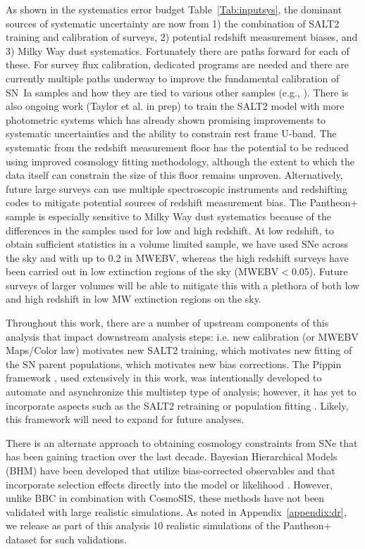 \documentclass[twocolumn]{aastex63}
\begin{document}
{ As shown in the systematics error budget Table~\ref{Tab:inputsys}, the dominant sources of systematic uncertainty are now from 1) the combination of SALT2 training and calibration of surveys, 2) potential redshift measurement biases, and 3) Milky Way dust systematics. Fortunately there are paths forward for each of these. For survey flux calibration, dedicated programs are needed and there are currently multiple paths underway to improve the fundamental calibration of SN~Ia samples and how they are tied to various other samples (e.g., \citealp{Regnault2015,Narayan19,stubbs2015precise}). There is also ongoing work (Taylor et al. in prep) to train the SALT2 model with more photometric systems which has already shown promising improvements to systematic uncertainties and the ability to constrain rest frame U-band. The systematic from the redshift measurement floor has the potential to be reduced using improved cosmology fitting methodology, although the extent to which the data itself can constrain the size of this floor remains unproven. Alternatively, future large surveys can use multiple spectroscopic instruments and redshifting codes to mitigate potential sources of redshift measurement bias. The Pantheon+ sample is especially sensitive to Milky Way dust systematics because of the differences in the samples used for low and high redshift. At low redshift, to obtain sufficient statistics in a volume limited sample, we have used SNe across the sky and with up to 0.2 in MWEBV, whereas the high redshift surveys have been carried out in low extinction regions of the sky (MWEBV$<$0.05). Future surveys of larger volumes will be able to mitigate this with a plethora of both low and high redshift in low MW extinction regions on the sky.}  

Throughout this work, there are a number of upstream components of this analysis that impact downstream analysis steps: i.e. new calibration (or MWEBV Maps/Color law) motivates new SALT2 training, which motivates new fitting of the SN parent populations, which motivates new bias corrections. The Pippin framework \citep{Pippin}, used extensively in this work, was intentionally developed to automate and asynchronize this multistep type of analysis; however, it has yet to incorporate aspects such as the SALT2 retraining \citep{taylor21} or population fitting \citep{popovic21b}. Likely, this framework will need to expand for future analyses.

{There is an alternate approach to obtaining cosmology constraints from SNe that has been gaining traction over the last decade. Bayesian Hierarchical Models (BHM) have been developed that utilize
bias-corrected observables \citep{BAHAMAS} and that incorporate selection effects
directly into the model \citep{UNITY} or likelihood \citep{Hinton18}. However, unlike BBC in combination with CosmoSIS, these methods have not been validated with large realistic simulations. As noted in Appendix~\ref{appendix:dr}, we release as part of this analysis 10 realistic simulations of the Pantheon+ dataset for such validations. }
\end{document}
